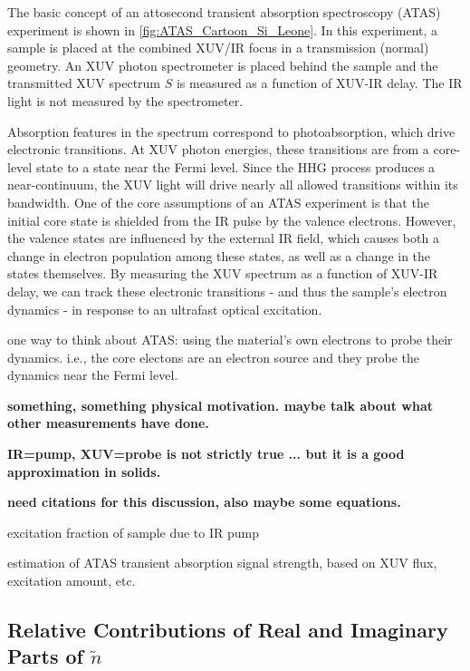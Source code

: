 The basic concept of an attosecond transient absorption spectroscopy (ATAS) experiment is shown in \cref{fig:ATAS_Cartoon_Si_Leone}. In this experiment, a sample is placed at the combined XUV/IR focus in a transmission (normal) geometry. An XUV photon spectrometer is placed behind the sample and the transmitted XUV spectrum $S$ is measured as a function of XUV-IR delay. The IR light is not measured by the spectrometer.

Absorption features in the spectrum correspond to photoabsorption, which drive electronic transitions. At XUV photon energies, these transitions are from a core-level state to a state near the Fermi level. Since the HHG process produces a near-continuum, the XUV light will drive nearly all allowed transitions within its bandwidth. One of the core assumptions of an ATAS experiment is that the initial core state is shielded from the IR pulse by the valence electrons. However, the valence states are influenced by the external IR field, which causes both a change in electron population among these states, as well as a change in the states themselves. By measuring the XUV spectrum as a function of XUV-IR delay, we can track these electronic transitions - and thus the sample's electron dynamics - in response to an ultrafast optical excitation.

one way to think about ATAS: using the material's own electrons to probe their dynamics. i.e., the core electons are an electron source and they probe the dynamics near the Fermi level.

\textbf{something, something physical motivation. maybe talk about what other measurements have done.}

\textbf{IR=pump, XUV=probe is not strictly true ... but it is a good approximation in solids.}

\textbf{need citations for this discussion, also maybe some equations.}

excitation fraction of sample due to IR pump

estimation of ATAS transient absorption signal strength, based on XUV flux, excitation amount, etc.


\subsection{Relative Contributions of Real and Imaginary Parts of $\tilde{n}$}

